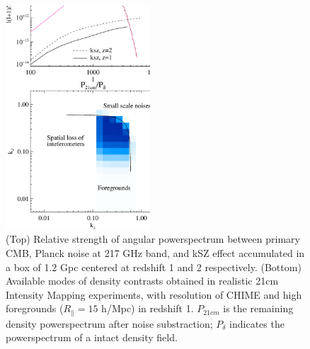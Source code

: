 
\begin{figure}[tbp]
\begin{center}
\includegraphics[width=0.48\textwidth]{figure/cmb_21cm.eps}
\end{center}
\vspace{-0.7cm}
\caption{
    (Top) Relative strength of angular powerspectrum between primary CMB, Planck noise at 217 GHz band, and kSZ effect accumulated in a box of 1.2 Gpc centered at redshift 1 and 2 respectively.
    (Bottom) Available modes of density contrasts obtained 
    in realistic 21cm Intensity Mapping experiments, 
    with resolution of CHIME and high foregrounds ($R_\parallel=15$ h/Mpc) 
    in redshift 1. 
    $P_{21cm}$ is the remaining density powerspectrum after noise substraction; 
    $P_\delta$ indicates the powerspectrum of a intact density field.
}
\label{fig:cmb_21cm}
\end{figure}


